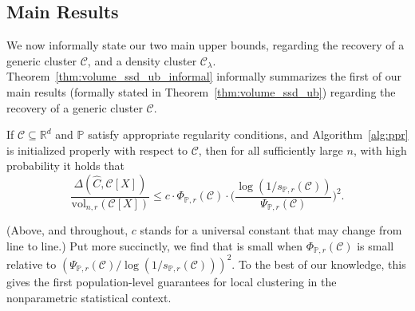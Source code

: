 \documentclass[twoside,11pt]{article}
\newcommand{\Reals}{\mathbb{R}}
\newcommand{\1}{\mathbf{1}}
\newcommand{\Rd}{\Reals^d}
\newcommand{\mc}[1]{\mathcal{#1}}
\newcommand{\Pbb}{\mathbb{P}}
\newcommand{\wh}[1]{\widehat{#1}}
\newcommand{\vol}{\mathrm{vol}}
\begin{document}
\subsection{Main Results}
We now informally state our two main upper bounds, regarding the recovery of a generic cluster $\mc{C}$, and a density cluster $\mc{C}_{\lambda}$. Theorem~\ref{thm:volume_ssd_ub_informal} informally summarizes the first of our main results (formally stated in Theorem~\ref{thm:volume_ssd_ub}) regarding the recovery of a generic cluster $\mc{C}$.
\begin{theorem}[Informal]
	\label{thm:volume_ssd_ub_informal}
	If $\mc{C} \subseteq \Rd$ and $\Pbb$ satisfy appropriate regularity conditions, and Algorithm~\ref{alg:ppr} is initialized properly with respect to $\mc{C}$, then for all sufficiently large $n$, with high probability it holds that
	\begin{equation*}
	\frac{\Delta(\wh{C},\mc{C}[X])}{\vol_{n,r}(\mc{C}[X])} \leq c \cdot\Phi_{\Pbb,r}(\mc{C}) \cdot  \biggl(\frac{\log(1/s_{\Pbb,r}(\mc{C}))}{\Psi_{\Pbb,r}(\mc{C})}\biggr)^2.
	\end{equation*}
\end{theorem}

(Above, and throughout, $c$ stands for a universal constant that may change from line to line.) Put more succinctly, we find that \smash{$\Delta(\wh{C},\mc{C}[X])$} is small when $\Phi_{\Pbb,r}(\mc{C})$ is small relative to $(\Psi_{\Pbb,r}(\mc{C})/\log(1/s_{\Pbb,r}(\mc{C})))^2$. To the best of our knowledge, this gives the first population-level guarantees for local clustering in the nonparametric statistical context.
\end{document}
